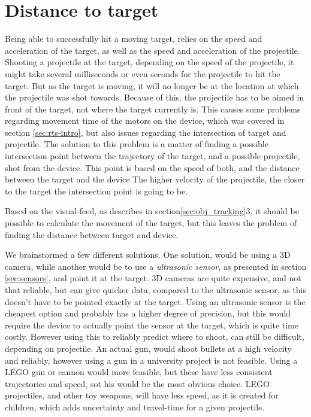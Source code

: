 
\section{Distance to target}
Being able to successfully hit a moving target, relies on the speed and acceleration of the target, as well as the speed and acceleration of the projectile.
Shooting a projectile at the target, depending on the speed of the projectile, it might take several milliseconds or even seconds for the projectile to hit the target.
But as the target is moving, it will no longer be at the location at which the projectile was shot towards.
Because of this, the projectile has to be aimed in front of the target, not where the target currently is.
This causes some problems regarding movement time of the motors on the device, which was covered in section \ref{sec:rts-intro}, but also issues regarding the intersection of target and projectile.
The solution to this problem is a matter of finding a possible intersection point between the trajectory of the target, and a possible projectile, shot from the device. 
This point is based on the speed of both, and the distance between the target and the device 
The higher velocity of the projectile, the closer to the target the intersection point is going to be.

Based on the visual-feed, as describes in section\ref{sec:obj_tracking}3, it should be possible to calculate the movement of the target, but this leaves the problem of finding the distance between target and device.


We brainstormed a few different solutions.
One solution, would be using a 3D camera, while another would be to use a \textit{ultrasonic sensor}, as presented in section \ref{sec:sensors}, and point it at the target.
3D cameras are quite expensive, and not that reliable, but can give quicker data, compared to the ultrasonic sensor, as this doesn't have to be pointed exactly at the target.
Using an ultrasonic sensor is the cheapest option and probably has a higher degree of precision, but this would require the device to actually point the sensor at the target, which is quite time costly.
However using this to reliably predict where to shoot, can still be difficult, depending on projectile.
An actual gun, would shoot bullets at a high velocity and reliably, however using a gun in a university project is not feasible.
Using a LEGO gun or cannon would more feasible, but these have less consistent trajectories and speed, sot his would be the most obvious choice.
LEGO projectiles, and other toy weapons, will have less speed, as it is created for children, which adds uncertainty and travel-time for a given projectile.


